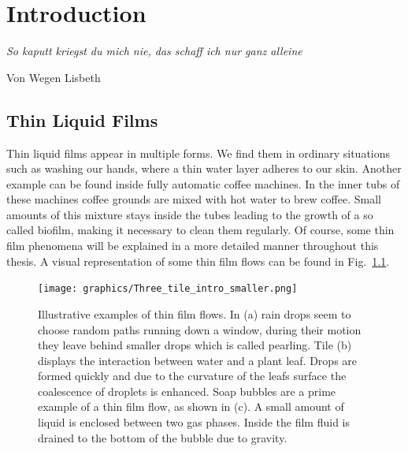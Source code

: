 \chapter{Introduction}
\label{chapter:intro}
\epigraph{\textit{So kaputt kriegst du mich nie, das schaff ich nur ganz alleine}}{Von Wegen Lisbeth}

\section{Thin Liquid Films}
Thin liquid films appear in multiple forms. 
We find them in ordinary situations such as washing our hands, where a thin water layer adheres to our skin. 
Another example can be found inside fully automatic coffee machines.
In the inner tubs of these machines coffee grounds are mixed with hot water to brew coffee. 
Small amounts of this mixture stays inside the tubes leading to the growth of a so called biofilm, making it necessary to clean them regularly.
Of course, some thin film phenomena will be explained in a more detailed manner throughout this thesis. 
A visual representation of some thin film flows can be found in Fig.~\ref{fig:examples_intro}.
\begin{figure}
    \centering
    \texttt{[image: graphics/Three\_tile\_intro\_smaller.png]}
    \caption{Illustrative examples of thin film flows. In (a) rain drops seem to choose random paths running down a window, during their motion they leave behind smaller drops which is called pearling. Tile (b) displays the interaction between water and a plant leaf. Drops are formed quickly and due to the curvature of the leafs surface the coalescence of droplets is enhanced. Soap bubbles are a prime example of a thin film flow, as shown in (c). A small amount of liquid is enclosed between two gas phases. Inside the film fluid is drained to the bottom of the bubble due to gravity.}
    \label{fig:examples_intro}
\end{figure}

